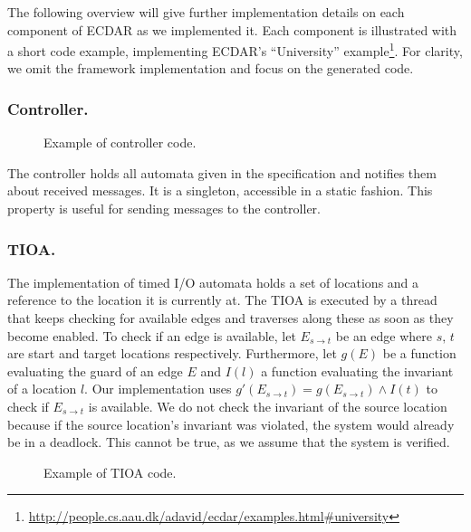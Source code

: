 The following overview will give further implementation details on each
component of ECDAR as we implemented it. Each component is illustrated with a
short code example, implementing ECDAR's ``University''
example\footnote{\url{http://people.cs.aau.dk/adavid/ecdar/examples.html#university}}. For
clarity, we omit the framework implementation and focus on the generated code.

\subsubsection{Controller.}

\begin{figure}[t]

\caption{Example of controller code.}
\label{controller-example}
\end{figure}

The controller holds all automata given in the specification and notifies them
about received messages. It is a singleton, accessible in a static fashion.
This property is useful for sending messages to the controller.

\subsubsection{TIOA.}

The implementation of timed I/O automata holds a set of locations and a
reference to the location it is currently at. The TIOA is executed by a thread
that keeps checking for available edges and traverses along these as soon as
they become enabled. To check if an edge is available, let $E_{s\rightarrow t}$
be an edge where $s,\, t$ are start and target locations
respectively. Furthermore, let $g(E)$ be a function evaluating the guard of an
edge $E$ and $I(l)$ a function evaluating the invariant of a location $l$. Our
implementation uses $g'(E_{s\rightarrow t})=g(E_{s\rightarrow t})\wedge I(t)$ to
check if $E_{s\rightarrow t}$ is available. We do not check the invariant of the
source location because if the source location's invariant was violated, the
system would already be in a deadlock. This cannot be true, as we assume that
the system is verified.

\begin{figure}[t]

\caption{Example of TIOA code.}
\label{tioa-example}
\end{figure}

